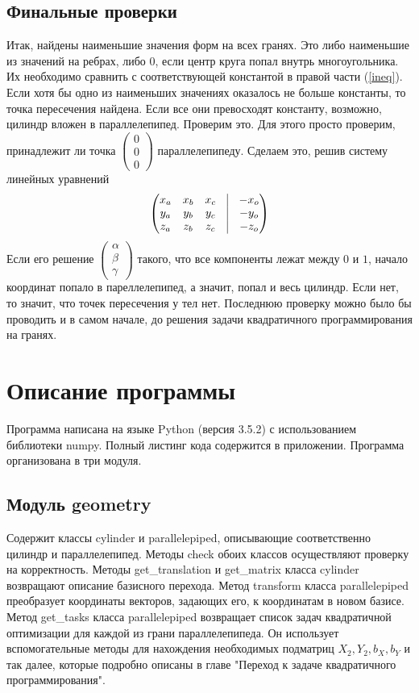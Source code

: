 \documentclass[pdftex,ptm,12pt,a4paper]{report}
\begin{document}
\section{Финальные проверки}
  Итак, найдены наименьшие значения форм на всех гранях. Это либо наименьшие из значений на ребрах, либо $0$, если центр круга попал внутрь многоугольника.
  Их необходимо сравнить с соответствующей константой в правой части (\ref{ineq}).
  Если хотя бы одно из наименьших значениях оказалось не больше константы, то точка пересечения найдена.
  Если все они превосходят константу, возможно, цилиндр вложен в параллелепипед.
  Проверим это.
  Для этого просто проверим, принадлежит ли точка $\begin{pmatrix}0 \\ 0 \\ 0 \end{pmatrix}$ параллелепипеду.
  Сделаем это, решив систему линейных уравнений
  \[
    \begin{pmatrix}
     x_a & x_b & x_c & \vrule & -x_o\\
     y_a & y_b & y_c & \vrule & -y_o \\
     z_a & z_b & z_c & \vrule & -z_o
     \end{pmatrix}
  \]
  Если его решение $\begin{pmatrix} \alpha \\ \beta \\ \gamma \end{pmatrix}$ такого, что все компоненты лежат между $0$ и $1$, начало координат попало в пареллелепипед, а значит, попал и весь цилиндр. Если нет, то значит, что точек пересечения у тел нет.
  Последнюю проверку можно было бы проводить и в самом начале, до решения задачи квадратичного программирования на гранях.
\clearpage

\chapter{Описание программы}

Программа написана на языке Python (версия 3.5.2) с использованием библиотеки numpy.
Полный листинг кода содержится в приложении.
Программа организована в три модуля.

\section{Модуль geometry}
Содержит классы cylinder и parallelepiped, описывающие соответственно цилиндр и параллелепипед.
Методы check обоих классов осуществляют проверку на корректность.
Методы get\_translation и get\_matrix класса cylinder возвращают описание базисного перехода.
Метод transform класса parallelepiped преобразует координаты векторов, задающих его, к координатам в новом базисе.
Метод get\_tasks класса parallelepiped возвращает список задач квадратичной оптимизации для каждой из грани параллелепипеда.
Он использует вспомогательные методы для нахождения необходимых подматриц $X_2, Y_2, b_X, b_Y$ и так далее, которые подробно описаны в
главе "Переход к задаче квадратичного программирования".
\end{document}
